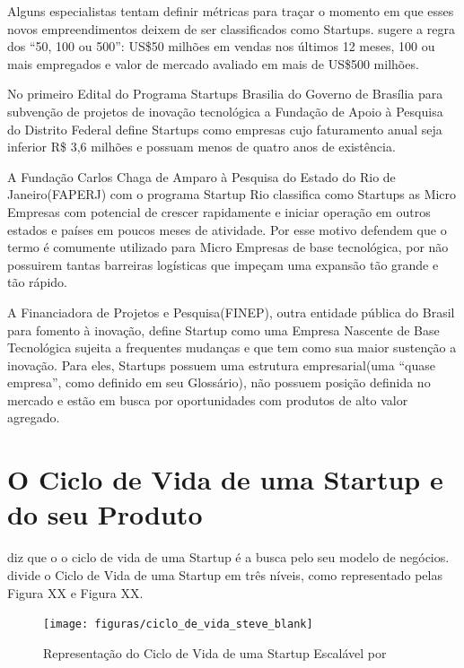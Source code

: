 Alguns especialistas tentam definir métricas para traçar o momento em que esses novos empreendimentos deixem de ser classificados como Startups.  sugere a regra dos ``50, 100 ou 500'': US\$50 milhões em vendas nos últimos 12 meses, 100 ou mais empregados e valor de mercado avaliado em mais de US\$500 milhões.   

No primeiro Edital do Programa Startups Brasilia do Governo de Brasília para subvenção de projetos de inovação tecnológica a Fundação de Apoio à Pesquisa do Distrito Federal define Startups como empresas cujo faturamento anual seja inferior R\$ 3,6 milhões e possuam menos de quatro anos de existência. 

A Fundação Carlos Chaga de Amparo à Pesquisa do Estado do Rio de Janeiro(FAPERJ) com o programa Startup Rio classifica como Startups as Micro Empresas com potencial de crescer rapidamente e iniciar operação em outros estados e países em poucos meses de atividade. Por esse motivo defendem que o termo é comumente utilizado para Micro Empresas de base tecnológica, por não possuirem tantas barreiras logísticas que impeçam uma expansão tão grande e tão rápido.

A Financiadora de Projetos e Pesquisa(FINEP), outra entidade pública do Brasil para fomento à inovação, define Startup como uma Empresa Nascente de Base Tecnológica sujeita a frequentes mudanças e que tem como sua maior sustenção a inovação. Para eles, Startups possuem uma estrutura empresarial(uma ``quase empresa'', como definido em seu Glossário), não possuem posição definida no mercado e estão em busca por oportunidades com produtos de alto valor agregado.

\section{O Ciclo de Vida de uma Startup e do seu Produto}
\label{section:o_ciclo_de_vida}

 diz que o o ciclo de vida de uma Startup é a busca pelo seu modelo de negócios.  divide o Ciclo de Vida de uma Startup em três níveis, como representado pelas Figura XX e Figura XX.

\begin{figure}[!htb]
\centering
\texttt{[image: figuras/ciclo\_de\_vida\_steve\_blank]}
\caption{Representação do Ciclo de Vida de uma Startup Escalável por \cite{Blank2014}}
\label{Rotulo}
\end{figure}


